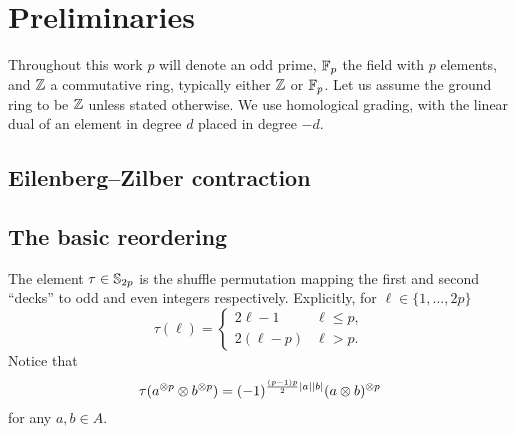 
\section{Preliminaries}

Throughout this work $p$ will denote an odd prime, ${\mathbb{F}_p}$ the field with $p$ elements, and $\mathbb{Z}$ a commutative ring, typically either $\mathbb{Z}$ or ${\mathbb{F}_p}$.
Let us assume the ground ring to be $\mathbb{Z}$ unless stated otherwise.
We use homological grading, with the linear dual of an element in degree $d$ placed in degree $-d$.

\subsection{Eilenberg--Zilber contraction}

\TBW

\subsection{The basic reordering}\label{ss:reordering}

The element $\tau \in \mathbb{S}_{2p}$ is the shuffle permutation mapping the first and second ``decks'' to odd and even integers respectively.
Explicitly, for $\ell \in \{1,\dots,2p\}$
\begin{equation*}
	\tau(\ell) =
	\begin{cases}
		2\ell-1 & \ell \leq p, \\
		2(\ell-p) & \ell > p.
	\end{cases}
\end{equation*}
Notice that
\[
\tau(a^{\otimes p} \otimes b^{\otimes p}) = (-1)^{\frac{(p-1)p}{2}\lvert a\rvert\lvert b\rvert} (a \otimes b)^{\otimes p}
\]
for any $a,b \in A$.